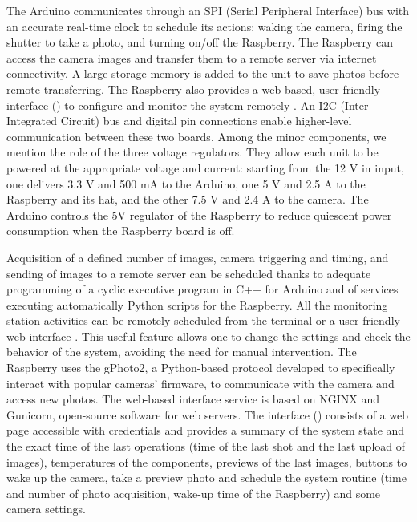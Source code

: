 The Arduino communicates through an SPI (Serial Peripheral Interface) bus with an
accurate real-time clock to schedule its actions: waking the camera, firing the shutter to take a photo, and turning on/off the Raspberry. 
The Raspberry can access the camera images and transfer them to a remote server via internet connectivity. 
A large storage memory is added to the unit to save photos before remote transferring. 
The Raspberry also provides a web-based, user-friendly interface
() to configure and monitor the system remotely
\citep{greig}.
An I2C (Inter Integrated Circuit) bus and digital pin connections enable higher-level
communication between these two boards. Among the minor components, we mention the role
of the three voltage regulators. They allow each unit to be powered at the appropriate
voltage and current: starting from the 12 V in input, one delivers 3.3 V and 500 mA to
the Arduino, one 5 V and 2.5 A to the Raspberry and its hat, and the other 7.5 V and 2.4
A to the camera. The Arduino controls the 5V regulator of the Raspberry to reduce
quiescent power consumption when the Raspberry board is off.

Acquisition of a defined number of images, camera triggering and timing, and sending of
images to a remote server can be scheduled thanks to adequate programming of a cyclic
executive program in C++ for Arduino and  of services executing automatically Python
scripts for the Raspberry.
All the monitoring station activities can be remotely scheduled from the terminal or a
user-friendly web interface \citep{greig}. 
This useful feature allows one to change the settings and check the behavior of the system, avoiding the need for manual intervention. 
The Raspberry uses the gPhoto2, a Python-based protocol developed to specifically interact with popular cameras’ firmware, to communicate with the camera and access new photos. 
The web-based interface service is based on NGINX and Gunicorn, open-source software for web servers. 
The interface () consists of a web page accessible with credentials and provides a summary of the system state and the exact time of the last operations (time of the last shot and the last upload of images), temperatures of the components, previews of the last images, buttons to wake up the camera, take a preview photo and schedule the system routine (time and number of photo acquisition, wake-up time of the Raspberry) and some camera settings.


